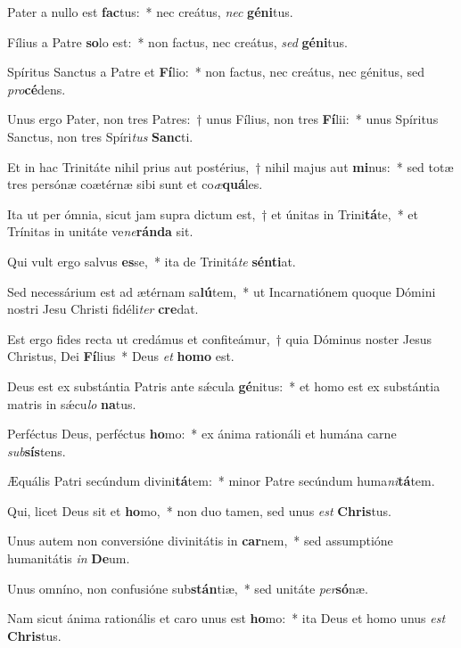 \item Pater a nullo est \textbf{fac}tus:~* nec creátus, \textit{nec} \textbf{gé}\textbf{ni}tus.
\item Fílius a Patre \textbf{so}lo est:~* non factus, nec creátus, \textit{sed} \textbf{gé}\textbf{ni}tus.
\item Spíritus Sanctus a Patre et \textbf{Fí}lio:~* non factus, nec creátus, nec génitus, sed \textit{pro}\textbf{cé}dens.
\item Unus ergo Pater, non tres Patres:~† unus Fílius, non tres \textbf{Fí}lii:~* unus Spíritus Sanctus, non tres Spíri\textit{tus} \textbf{Sanc}ti.
\item Et in hac Trinitáte nihil prius aut postérius,~† nihil majus aut \textbf{mi}nus:~* sed totæ tres persónæ coætérnæ sibi sunt et co\textit{æ}\textbf{quá}les.
\item Ita ut per ómnia, sicut jam supra dictum est,~† et únitas in Trini\textbf{tá}te,~* et Trínitas in unitáte ve\textit{ne}\textbf{rán}\textbf{da} sit.
\item Qui vult ergo salvus \textbf{es}se,~* ita de Trinitá\textit{te} \textbf{sén}\textbf{ti}at.
\item Sed necessárium est ad ætérnam sa\textbf{lú}tem,~* ut Incarnatiónem quoque Dómini nostri Jesu Christi fidéli\textit{ter} \textbf{cre}dat.
\item Est ergo fides recta ut credámus et confiteámur,~† quia Dóminus noster Jesus Christus, Dei \textbf{Fí}lius~* Deus \textit{et} \textbf{ho}\textbf{mo} est.
\item Deus est ex substántia Patris ante sǽcula \textbf{gé}nitus:~* et homo est ex substántia matris in sǽcu\textit{lo} \textbf{na}tus.
\item Perféctus Deus, perféctus \textbf{ho}mo:~* ex ánima rationáli et humána carne \textit{sub}\textbf{sís}tens.
\item Æquális Patri secúndum divini\textbf{tá}tem:~* minor Patre secúndum huma\textit{ni}\textbf{tá}tem.
\item Qui, licet Deus sit et \textbf{ho}mo,~* non duo tamen, sed unus \textit{est} \textbf{Chris}tus.
\item Unus autem non conversióne divinitátis in \textbf{car}nem,~* sed assumptióne humanitátis \textit{in} \textbf{De}um.
\item Unus omníno, non confusióne sub\textbf{stán}tiæ,~* sed unitáte \textit{per}\textbf{só}næ.
\item Nam sicut ánima rationális et caro unus est \textbf{ho}mo:~* ita Deus et homo unus \textit{est} \textbf{Chris}tus.
